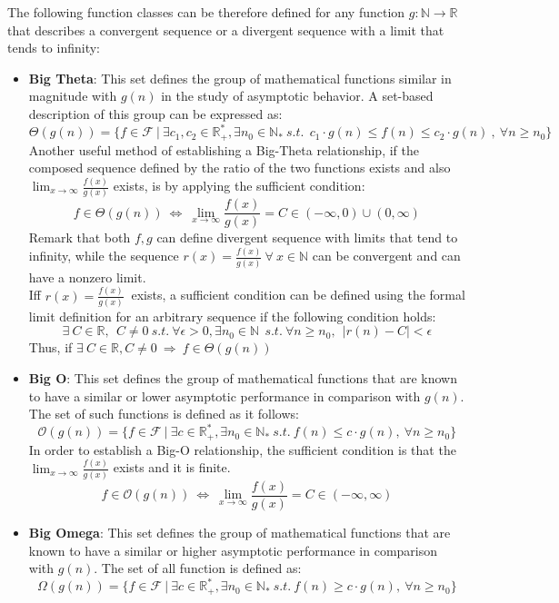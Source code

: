 \documentclass{article}
\begin{document}
The following function classes can be therefore defined for any function $g:\mathbb{N}\longrightarrow\mathbb{R}$ that describes a convergent sequence or a divergent sequence with a limit that tends to infinity:
\begin{itemize}
  \item \textbf{Big Theta}: This set defines the group of mathematical functions similar in magnitude with  $g(n)$ in the study of asymptotic behavior. A set-based description of this group can be expressed as:
  \[\Theta(g(n))= \lbrace f \in \mathcal{F}\ |\ \exists c_{1}, c_{2} \in \mathbb{R}^{*}_{+}, \exists n_{0} \in \mathbb{N}_{*}\ s.t.\ \ c_{1} \cdot g(n) \leq f(n) \leq c_{2} \cdot g(n)\ ,\  \forall n \geq n_{0} \rbrace\]
  Another useful method of establishing a Big-Theta relationship, if the composed sequence defined by the ratio of the two functions exists and also $ \lim_{x\to\infty} \frac{f(x)}{g(x)}$ exists, is by applying the sufficient condition:
    \[ f \in \Theta(g(n))\ \Leftrightarrow\ \lim_{x\to\infty} \frac{f(x)}{g(x)} = C \in (-\infty, 0) \cup (0,\infty) \]
Remark that  both $f,g$ can define divergent sequence with limits that tend to infinity, while the sequence $r(x) = \frac{f(x)}{g(x)}\ \forall\ x\in\mathbb{N}$ can be convergent and can have a nonzero limit. \\
Iff $ r(x) = \frac{f(x)}{g(x)}\ $ exists, a sufficient condition can be defined using the formal limit definition for an arbitrary sequence if the following condition holds:
  \[\exists \  C \in \mathbb{R}, \ \ C \neq 0 \ s.t. \ \forall \epsilon > 0,\exists n_{0} \in \mathbb{N}\ \ s.t.\ \forall n\geq n_{0}, \ \  |r(n) - C| < \epsilon  \]
  Thus, if $ \exists \  C \in \mathbb{R}, C \neq 0 \  \Rightarrow\  f \in \Theta(g(n))\ $
  \item \textbf{Big O}: This set defines the group of mathematical functions that are known to have a similar or lower
 asymptotic performance in comparison with  $g(n)$. The set of such functions is defined as it follows:
  \[\mathcal{O}(g(n)) = \lbrace f \in \mathcal{F}\ |\ \exists c \in \mathbb{R}^{*}_{+}, \exists n_{0} \in \mathbb{N}_{*}\ s.t.\  f(n) \leq c \cdot g(n),\  \forall n \geq n_{0} \rbrace\]
  In order to establish a Big-O relationship, the sufficient condition is that the $ \lim_{x\to\infty} \frac{f(x)}{g(x)}$ exists and it is finite. 
  \[ f \in \mathcal{O}(g(n))\ \Leftrightarrow\ \lim_{x\to\infty} \frac{f(x)}{g(x)} = C \in (-\infty, \infty) \]
  \item \textbf{Big Omega}: This set defines the group of mathematical functions that are known to have a similar or higher asymptotic performance in comparison with  $g(n)$. The set of all function is defined as:
    \[\Omega(g(n)) = \lbrace f \in \mathcal{F}\ |\ \exists c \in \mathbb{R}^{*}_{+}, \exists n_{0} \in \mathbb{N}_{*}\ s.t.\  f(n) \geq c \cdot g(n),\  \forall n \geq n_{0} \rbrace\]


\end{itemize}
\end{document}
